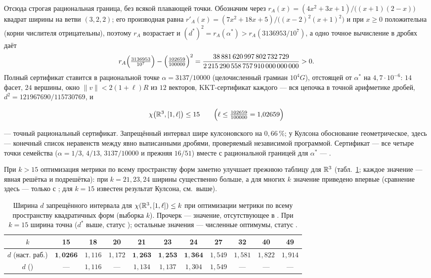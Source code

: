 Отсюда строгая рациональная граница, без всякой плавающей точки. Обозначим
через $r_A(x)=(4x^2+3x+1)/\bigl((x+1)(2-x)\bigr)$ квадрат ширины на ветви
$(3,2,2)$; его производная равна
$r'_A(x)=(7x^2+18x+5)/\bigl((x-2)^2(x+1)^2\bigr)$ и при $x\ge0$ положительна
(корни числителя отрицательны), поэтому $r_A$ возрастает и
$(d^*)^2=r_A(\alpha^*)>r_A(3136953/10^7)$, а одно точное вычисление в дробях
даёт
\[
r_A\Bigl(\tfrac{3136953}{10^7}\Bigr)-\Bigl(\tfrac{102659}{100000}\Bigr)^2
=\frac{38\,881\,620\,997\,802\,732\,729}
{2\,215\,290\,558\,757\,910\,000\,000\,000}>0 .
\]
Полный сертификат ставится в рациональной точке $\alpha=3137/10000$
(целочисленный грамиан $10^4G$), отстоящей от $\alpha^*$ на
$4{,}7\cdot10^{-6}$: $14$ фасет, $24$ вершины, окно $\|v\|<2(1+\ell)R$ из
$12$ векторов, KKT-сертификат каждого --- вся цепочка в точной арифметике
дробей, $d^2=121967690/115730769$, и
\begin{keybox}
\[
\chi\bigl(\mathbb{R}^3,[1,\ell]\bigr)\le15\qquad
\Bigl(\ell\le\tfrac{102659}{100000}=1{,}02659\Bigr)
\]
\end{keybox}
\noindent --- точный рациональный сертификат. Запрещённый интервал шире
кулсоновского на $0{,}66\,\%$; у Кулсона обоснование геометрическое, здесь ---
конечный список неравенств между явно выписанными дробями, проверяемый
независимой программой. Сертификат --- все четыре точки семейства
($\alpha=1/3$, $4/13$, $3137/10000$ и прежняя $16/51$) вместе с рациональной
границей для $\alpha^*$ --- .

При $k>15$ оптимизация метрики по всему пространству форм заметно улучшает
прежнюю таблицу \cite{Ivanov2011} для $\mathbb{R}^3$ (табл.~\ref{tab:r3}; каждое значение
--- явная решётка и подрешётка): при $k=21,23,24$ ширины существенно больше, а
для многих $k$ значение приведено впервые (сравнение здесь --- только
с \cite{Ivanov2011}; для $k=15$ известен результат Кулсона, см.\ выше).

\begin{table}[h]
\centering
\caption{Ширина $d$ запрещённого интервала для $\chi(\mathbb{R}^3,[1,\ell])\le k$ при
оптимизации метрики по всему пространству квадратичных форм (выборка $k$).
Прочерк --- значение, отсутствующее в \cite{Ivanov2011}. При $k=15$ ширина
точна ($d^*$ выше, статус \stC); остальные значения --- численные оптимумы,
статус \stN.}
\label{tab:r3}
\small
\begin{tabular}{c cccccccccc}
\toprule
$k$ & 15 & 18 & 20 & 21 & 23 & 24 & 27 & 32 & 40 & 49\\
\midrule
$d$ (наст. раб.) & $\mathbf{1{,}0266}$ & $1{,}116$ & $1{,}172$ & $\mathbf{1{,}263}$
  & $\mathbf{1{,}253}$ & $\mathbf{1{,}364}$ & $1{,}549$ & $1{,}581$ & $1{,}822$
  & $1{,}914$\\
$d$ (\cite{Ivanov2011}) & --- & $1{,}116$ & --- & $1{,}134$ & $1{,}137$ &
  $1{,}304$ & $1{,}549$ & --- & --- & ---\\
\bottomrule
\end{tabular}
\end{table}


